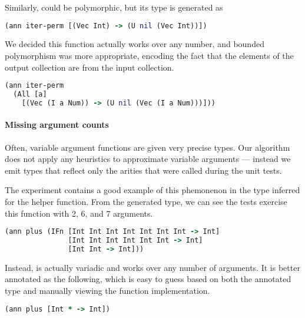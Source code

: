Similarly,  could be polymorphic, 
but its type is generated as

\begin{lstlisting}[language=Clojure]
(ann iter-perm [(Vec Int) -> (U nil (Vec Int))])
\end{lstlisting}

We decided this function actually works over any number,
and bounded polymorphism was more appropriate, encoding
the fact that the elements of the output collection
are from the input collection.

\begin{lstlisting}[language=Clojure]
(ann iter-perm
  (All [a]
    [(Vec (I a Num)) -> (U nil (Vec (I a Num)))]))
\end{lstlisting}
%

\paragraph{Missing argument counts}
Often, variable argument functions are given very precise types.
Our algorithm does not apply any heuristics to approximate
variable arguments --- instead we emit types that reflect
only the arities that were called during the unit tests.

The  experiment contains
a good example of this phemonenon in the type inferred
for the  helper function.
From the generated type, we can see the tests exercise this function with 2, 6,
and 7 arguments.

\begin{lstlisting}[language=Clojure]
(ann plus (IFn [Int Int Int Int Int Int Int -> Int]
               [Int Int Int Int Int Int -> Int]
               [Int Int -> Int]))
\end{lstlisting}

Instead,  is actually variadic and works over any number of arguments.
It is better annotated as the following, which is easy to guess based on
both the annotated type and manually viewing the function implementation.

\begin{lstlisting}[language=Clojure]
(ann plus [Int * -> Int])
\end{lstlisting}

